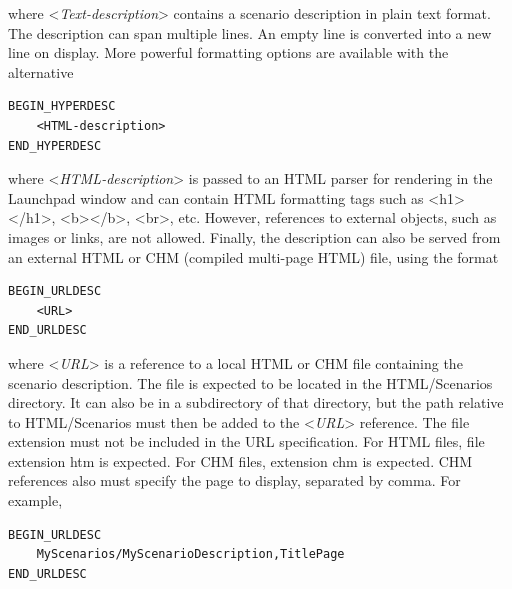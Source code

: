 \documentclass[Orbiter Developer Manual.tex]{subfiles}
\begin{document}
\noindent
where <\textit{Text-description}> contains a scenario description in plain text format. The description can span multiple lines. An empty line is converted into a new line on display. More powerful formatting options are available with the alternative

\begin{lstlisting}[language=OSFS]
BEGIN_HYPERDESC
	<HTML-description>
END_HYPERDESC
\end{lstlisting}

\noindent
where <\textit{HTML-description}> is passed to an HTML parser for rendering in the Launchpad window and can contain HTML formatting tags such as <h1></h1>, <b></b>, <br>, etc. However, references to external objects, such as images or links, are not allowed.
Finally, the description can also be served from an external HTML or CHM (compiled multi-page HTML) file, using the format

\begin{lstlisting}[language=OSFS]
BEGIN_URLDESC
	<URL>
END_URLDESC
\end{lstlisting}

\noindent
where <\textit{URL}> is a reference to a local HTML or CHM file containing the scenario description. The file is expected to be located in the HTML/Scenarios directory. It can also be in a subdirectory of that directory, but the path relative to HTML/Scenarios must then be added to the <\textit{URL}> reference. The file extension must not be included in the URL specification. For HTML files, file extension htm is expected. For CHM files, extension chm is expected. CHM references also must specify the page to display, separated by comma. For example,

\begin{lstlisting}[language=OSFS]
BEGIN_URLDESC
	MyScenarios/MyScenarioDescription,TitlePage
END_URLDESC
\end{lstlisting}
\end{document}
